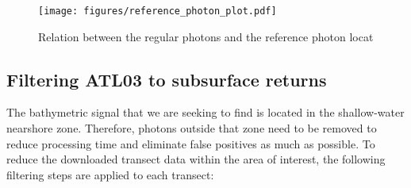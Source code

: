 \begin{figure}[h]
    \centering
    \texttt{[image: figures/reference\_photon\_plot.pdf]}
    \caption{Relation between the regular photons and the reference photon locat}
    \label{fig:reference-photon_match} 
\end{figure}

\subsection{Filtering ATL03 to subsurface returns}

The bathymetric signal that we are seeking to find is located in the shallow-water nearshore zone. Therefore, photons outside that zone need to be removed to reduce processing time and eliminate false positives as much as possible. To reduce the downloaded transect data within the area of interest, the following filtering steps are applied to each transect:


